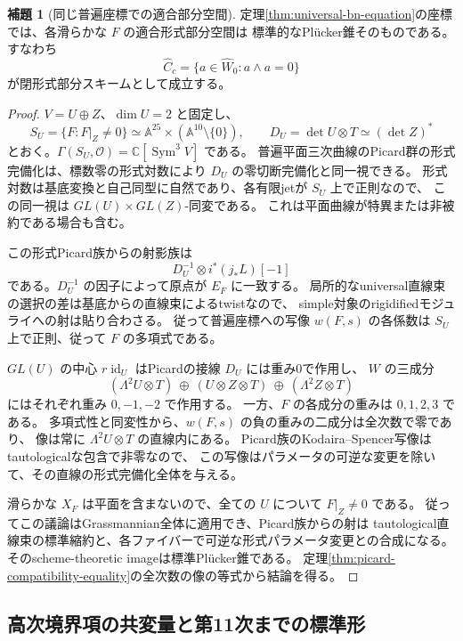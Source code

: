 \documentclass[a4paper,11pt]{ltjsarticle}
\theoremstyle{definition}
\newtheorem{lemma}[theorem]{補題}
\newcommand{\CC}{\mathbb C}
\newcommand{\OO}{\mathcal O}
\newcommand{\Aff}{\mathbb A}
\newcommand{\Sym}{\operatorname{Sym}}
\newcommand{\id}{\operatorname{id}}
\begin{document}
\begin{lemma}[同じ普遍座標での適合部分空間]
\label{lem:universal-chart-plucker}
定理\ref{thm:universal-bn-equation}の座標では、各滑らかな $F$ の適合形式部分空間は
標準的なPl\"ucker錐そのものである。すなわち
\[
             \widehat C_c=\{a\in\widehat W_0:a\wedge a=0\}
\]
が閉形式部分スキームとして成立する。
\end{lemma}

\begin{proof}
$V=U\oplus Z$、$\dim U=2$ と固定し、
\[
 S_U=\{F:F|_Z\ne0\}
      \simeq\Aff^{25}\times(\Aff^{10}\setminus\{0\}),\qquad
 D_U=\det U\otimes T\simeq(\det Z)^*
\]
とおく。$\Gamma(S_U,\OO)=\CC[\Sym^3V]$ である。
普遍平面三次曲線のPicard群の形式完備化は、標数零の形式対数により
$D_U$ の零切断完備化と同一視できる。
形式対数は基底変換と自己同型に自然であり、各有限jetが $S_U$ 上で正則なので、
この同一視は $GL(U)\times GL(Z)$-同変である。
これは平面曲線が特異または非被約である場合も含む。

この形式Picard族からの射影族は
\[
                    D_U^{-1}\otimes i^*(j_*L)[-1]
\]
である。$D_U^{-1}$ の因子によって原点が $E_F$ に一致する。
局所的なuniversal直線束の選択の差は基底からの直線束によるtwistなので、
simple対象のrigidifiedモジュライへの射は貼り合わさる。
従って普遍座標への写像 $w(F,s)$ の各係数は $S_U$ 上で正則、従って $F$ の多項式である。

$GL(U)$ の中心 $r\id_U$ はPicardの接線 $D_U$ には重み0で作用し、
$W$ の三成分
\[
 (\Lambda^2U\otimes T)\ \oplus\ (U\otimes Z\otimes T)
                         \ \oplus\ (\Lambda^2Z\otimes T)
\]
にはそれぞれ重み $0,-1,-2$ で作用する。
一方、$F$ の各成分の重みは $0,1,2,3$ である。
多項式性と同変性から、$w(F,s)$ の負の重みの二成分は全次数で零であり、
像は常に $\Lambda^2U\otimes T$ の直線内にある。
Picard族のKodaira--Spencer写像はtautologicalな包含で非零なので、
この写像はパラメータの可逆な変更を除いて、その直線の形式完備化全体を与える。

滑らかな $X_F$ は平面を含まないので、全ての $U$ について $F|_Z\ne0$ である。
従ってこの議論はGrassmannian全体に適用でき、Picard族からの射は
tautological直線束の標準縮約と、各ファイバーで可逆な形式パラメータ変更との合成になる。
そのscheme-theoretic imageは標準Pl\"ucker錐である。
定理\ref{thm:picard-compatibility-equality}の全次数の像の等式から結論を得る。
\end{proof}


\subsection{高次境界項の共変量と第11次までの標準形}
\label{subsec:boundary-higher-jets}
\end{document}
